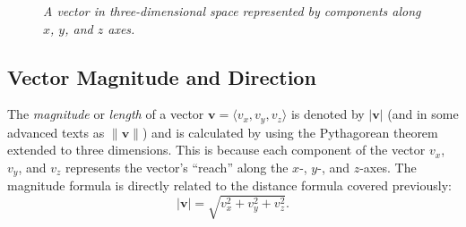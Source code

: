 \begin{figure}[H]
    \centering


    \caption{\textit{A vector in three-dimensional space represented by components along \( x \), \( y \), and \( z \) axes.}}
    \label{fig:3d_vector}
\end{figure}


\subsection*{Vector Magnitude and Direction}

\noindent The \textit{magnitude} or \textit{length} of a vector \( \mathbf{v} = \langle v_x, v_y, v_z \rangle \) is denoted by \( |\mathbf{v}| \) (and in some advanced texts as \( \| \mathbf{v} \| \)) and is calculated by using the Pythagorean theorem extended to three dimensions. This is because each component of the vector \( v_x \), \( v_y \), and \( v_z \) represents the vector’s ``reach” along the \( x \)-, \( y \)-, and \( z \)-axes. The magnitude formula is directly related to the distance formula covered previously:
\[
|\mathbf{v}| = \sqrt{v_x^2 + v_y^2 + v_z^2}.
\]

